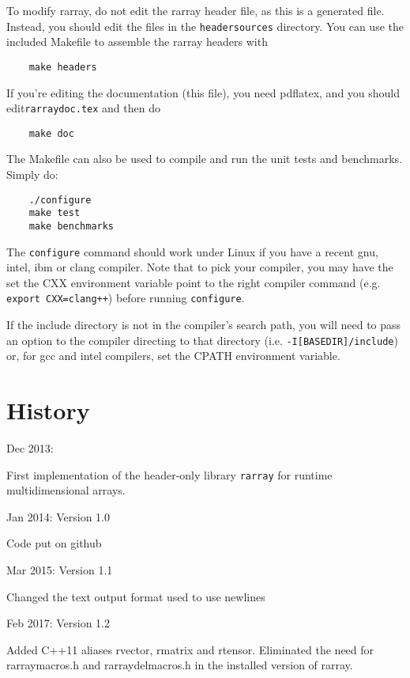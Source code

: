 \documentclass[11pt,twoside]{article}
\begin{document}
To modify rarray, do not edit the rarray header file, as this is a generated file. Instead, you
should edit the files in the \texttt{headersources} directory.  You
can use the included Makefile to assemble the rarray headers with
\begin{verbatim}
    make headers
\end{verbatim}

If you're editing the documentation (this file), you need pdflatex, and you should edit\linebreak \texttt{rarraydoc.tex} and then do
\begin{verbatim}
    make doc
\end{verbatim}

The Makefile can also be used to compile and run the unit tests and benchmarks. Simply do:
\begin{verbatim}
    ./configure
    make test
    make benchmarks
\end{verbatim}
The \texttt{configure} command should work under Linux if you have a recent
gnu, intel, ibm or clang compiler.  Note that to pick your compiler,
you may have the set the CXX environment variable point to the right
compiler command (e.g. \texttt{export CXX=clang++}) before running \texttt{configure}.

If the include directory is not in the compiler's search path, you
will need to pass an option to the compiler directing to that
directory (i.e. \texttt{-I[BASEDIR]/include}) or, for gcc and intel compilers,
set the CPATH environment variable.

\newpage

\section{History}

Dec 2013:

First implementation of the header-only library \texttt{rarray} for runtime multidimensional arrays.

\noindent
Jan 2014: Version 1.0

Code put on github

\noindent
Mar 2015: Version 1.1

Changed the text output format used to use newlines

\noindent
Feb 2017: Version 1.2

Added C++11 aliases rvector, rmatrix and rtensor. Eliminated the need
for rarraymacros.h and rarraydelmacros.h in the installed version of
rarray.
\end{document}
